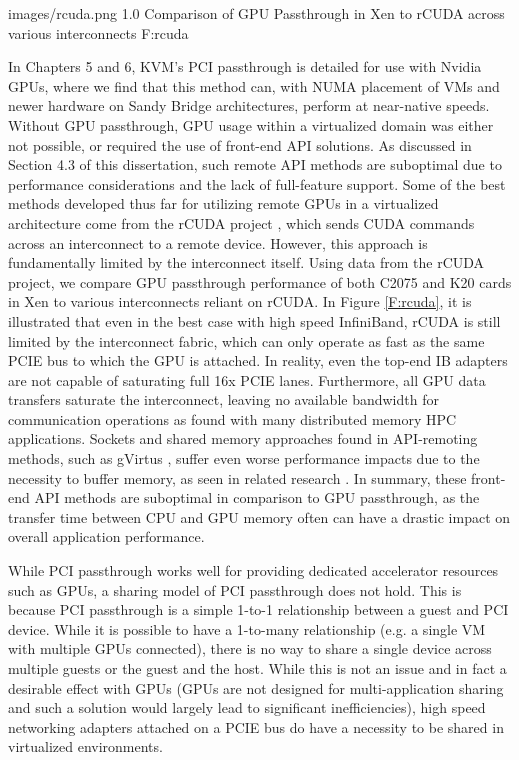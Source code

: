   {images/rcuda.png}
  {1.0}
  {Comparison of GPU Passthrough in Xen to rCUDA across various interconnects}
  {F:rcuda}

In Chapters 5 and 6, KVM's PCI passthrough is detailed for use with Nvidia GPUs, where we find that this method can, with NUMA placement of VMs and newer hardware on Sandy Bridge architectures, perform at near-native speeds. Without GPU passthrough, GPU usage within a virtualized domain was either not possible, or required the use of front-end API solutions. As discussed in Section 4.3 of this dissertation, such remote API methods are suboptimal due to performance considerations and the lack of full-feature support. Some of the best methods developed thus far for utilizing remote GPUs in a virtualized architecture come from the rCUDA project \cite{duato2011enabling}, which sends CUDA commands across an interconnect to a remote device. However, this approach is fundamentally limited by the interconnect itself.  Using data from the rCUDA \cite{silla2013rcuda} project, we compare GPU passthrough performance of both C2075 and K20 cards in Xen to various interconnects reliant on rCUDA.  In Figure \ref{F:rcuda}, it is illustrated that even in the best case with high speed InfiniBand, rCUDA is still limited by the interconnect fabric, which can only operate as fast as the same PCIE bus to which the GPU is attached.  In reality, even the top-end IB adapters are not capable of saturating full 16x PCIE lanes.  Furthermore,  all GPU data transfers saturate the interconnect, leaving no available bandwidth for communication operations as found with many distributed memory HPC applications.  Sockets and shared memory approaches found in API-remoting methods, such as gVirtus \cite{gvirtus}, suffer even worse performance impacts due to the necessity to buffer memory, as seen in related research \cite{walters2015gpu}.   In summary, these front-end API methods are suboptimal in comparison to GPU passthrough, as the transfer time between CPU and GPU memory often can have a drastic impact on overall application performance.

While PCI passthrough works well for providing dedicated accelerator resources such as GPUs, a sharing model of PCI passthrough does not hold. This is because PCI passthrough is a simple 1-to-1 relationship between a guest and PCI device. While it is possible to have a 1-to-many relationship (e.g. a single VM with multiple GPUs connected), there is no way to share a single device across multiple guests or the guest and the host. While this is not an issue and in fact a desirable effect with GPUs (GPUs are not designed for multi-application sharing and such a solution would largely lead to significant inefficiencies), high speed networking adapters attached on a PCIE bus do have a necessity to be shared in virtualized environments.

